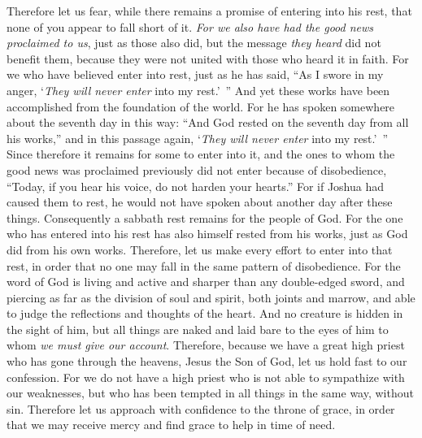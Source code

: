 \begin{biblechapter} %
 Therefore let us fear, while there remains a promise of entering into his rest, that none of you appear to fall short of it.
\verse \textit{For we also have had the good news proclaimed to us}, just as those also did, but the message \textit{they heard} did not benefit them, because they were not united with those who heard it in faith.
\verse For we who have believed enter into rest, just as he has said, “As I swore in my anger, 
‘\textit{They will never enter} into my rest.’ ”
\verse And yet these works have been accomplished from the foundation of the world.
\verse For he has spoken somewhere about the seventh day in this way: “And God rested on the seventh day from all his works,”
\verse and in this passage again, ‘\textit{They will never enter} into my rest.’ ”
\verse Since therefore it remains for some to enter into it, and the ones to whom the good news was proclaimed previously did not enter because of disobedience, “Today, if you hear his voice, 
do not harden your hearts.”
\verse For if Joshua had caused them to rest, he would not have spoken about another day after these things.
\verse Consequently a sabbath rest remains for the people of God.
\verse For the one who has entered into his rest has also himself rested from his works, just as God did from his own works.
\verse Therefore, let us make every effort to enter into that rest, in order that no one may fall in the same pattern of disobedience.
\verse For the word of God is living and active and sharper than any double-edged sword, and piercing as far as the division of soul and spirit, both joints and marrow, and able to judge the reflections and thoughts of the heart.
\verse And no creature is hidden in the sight of him, but all things are naked and laid bare to the eyes of him to whom \textit{we must give our account}.
 Therefore, because we have a great high priest who has gone through the heavens, Jesus the Son of God, let us hold fast to our confession.
\verse For we do not have a high priest who is not able to sympathize with our weaknesses, but who has been tempted in all things in the same way, without sin.
\verse Therefore let us approach with confidence to the throne of grace, in order that we may receive mercy and find grace to help in time of need.
\end{biblechapter}


